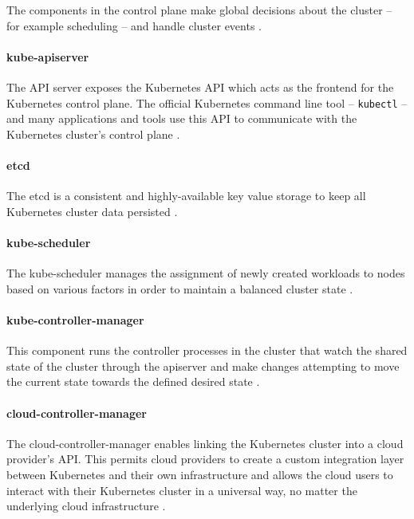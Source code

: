 The components in the control plane make global decisions about the cluster -- for example scheduling -- and handle cluster events \cite{KubernetesArchitecture}. 

\paragraph{kube-apiserver} The API server exposes the Kubernetes API which acts as the frontend for the Kubernetes control plane. The official Kubernetes command line tool -- \texttt{kubectl} -- and many applications and tools use this API to communicate with the Kubernetes cluster's control plane \cite{KubernetesArchitecture}.

\paragraph{etcd} The etcd is a consistent and highly-available key value storage to keep all Kubernetes cluster data persisted \cite{KubernetesArchitecture}.

\paragraph{kube-scheduler} The kube-scheduler manages the assignment of newly created workloads to nodes based on various factors in order to maintain a balanced cluster state \cite{KubernetesArchitecture}.

\paragraph{kube-controller-manager} This component runs the controller processes in the cluster that watch the shared state of the cluster through the apiserver and make changes attempting to move the current state towards the defined desired state \cite{KubernetesArchitecture}.

\paragraph{cloud-controller-manager} The cloud-controller-manager enables linking the Kubernetes cluster into a cloud provider's API. This permits cloud providers to create a custom integration layer between Kubernetes and their own infrastructure and allows the cloud users to interact with their Kubernetes cluster in a universal way, no matter the underlying cloud infrastructure \cite{KubernetesArchitecture}.

